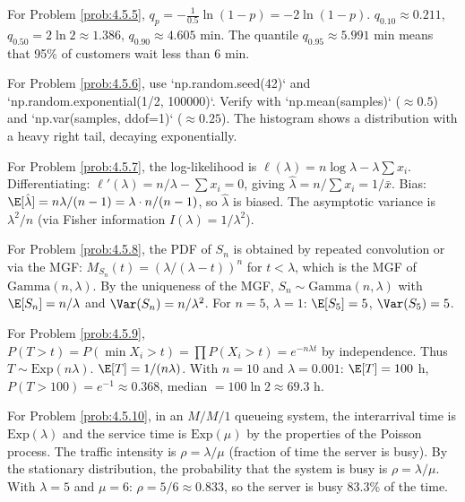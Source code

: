 \begin{sugerencia}
	\label{sug:4.5.5}
	For Problem \ref{prob:4.5.5}, $q_{p} = -\frac{1}{0.5}\ln(1-p) = -2\ln(1-p)$. $q_{0.10} \approx 0.211$, $q_{0.50} = 2 \ln 2 \approx 1.386$, $q_{0.90} \approx 4.605$ min. The quantile $q_{0.95} \approx 5.991$ min means that 95\% of customers wait less than 6 min.
\end{sugerencia}

\begin{sugerencia}
	\label{sug:4.5.6}
	For Problem \ref{prob:4.5.6}, use `np.random.seed(42)` and `np.random.exponential(1/2, 100000)`. Verify with `np.mean(samples)` ($\approx 0.5$) and `np.var(samples, ddof=1)` ($\approx 0.25$). The histogram shows a distribution with a heavy right tail, decaying exponentially.
\end{sugerencia}

\begin{sugerencia}
	\label{sug:4.5.7}
	For Problem \ref{prob:4.5.7}, the log-likelihood is $\ell(\lambda) = n\log \lambda - \lambda \sum x_i$. Differentiating: $\ell'(\lambda) = n/\lambda - \sum x_i = 0$, giving $\hat{\lambda} = n/\sum x_i = 1/\bar{x}$. Bias: $\E[\hat{\lambda}] = n\lambda/(n-1) = \lambda \cdot n/(n-1)$, so $\hat{\lambda}$ is biased. The asymptotic variance is $\lambda^{2}/n$ (via Fisher information $I(\lambda) = 1/\lambda^{2}$).
\end{sugerencia}

\begin{sugerencia}
	\label{sug:4.5.8}
	For Problem \ref{prob:4.5.8}, the PDF of $S_{n}$ is obtained by repeated convolution or via the MGF: $M_{S_{n}}(t) = (\lambda/(\lambda - t))^{n}$ for $t < \lambda$, which is the MGF of $\text{Gamma}(n, \lambda)$. By the uniqueness of the MGF, $S_{n} \sim \text{Gamma}(n, \lambda)$ with $\E[S_{n}] = n/\lambda$ and $\Var(S_{n}) = n/\lambda^{2}$. For $n = 5$, $\lambda = 1$: $\E[S_{5}] = 5$, $\Var(S_{5}) = 5$.
\end{sugerencia}

\begin{sugerencia}
	\label{sug:4.5.9}
	For Problem \ref{prob:4.5.9}, $P(T > t) = P(\min X_{i} > t) = \prod P(X_{i} > t) = e^{-n\lambda t}$ by independence. Thus $T \sim \text{Exp}(n\lambda)$. $\E[T] = 1/(n\lambda)$. With $n = 10$ and $\lambda = 0.001$: $\E[T] = 100$ h, $P(T > 100) = e^{-1} \approx 0.368$, median $= 100 \ln 2 \approx 69.3$ h.
\end{sugerencia}

\begin{sugerencia}
	\label{sug:4.5.10}
	For Problem \ref{prob:4.5.10}, in an $M/M/1$ queueing system, the interarrival time is $\text{Exp}(\lambda)$ and the service time is $\text{Exp}(\mu)$ by the properties of the Poisson process. The traffic intensity is $\rho = \lambda/\mu$ (fraction of time the server is busy). By the stationary distribution, the probability that the system is busy is $\rho = \lambda/\mu$. With $\lambda = 5$ and $\mu = 6$: $\rho = 5/6 \approx 0.833$, so the server is busy 83.3\% of the time.
\end{sugerencia}

